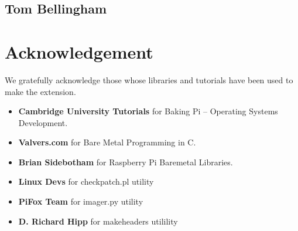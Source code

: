 \documentclass[11pt]{article}
\begin{document}
\subsection{Tom Bellingham}

\section{Acknowledgement}

We gratefully acknowledge those  whose libraries and tutorials have been used
to make the extension.

\begin{itemize}[noitemsep,topsep=0pt]
  \item \textbf{Cambridge University Tutorials} for Baking Pi –
    Operating Systems Development.
  \item \textbf{Valvers.com} for Bare Metal Programming in C.
  \item \textbf{Brian Sidebotham} for Raspberry Pi Baremetal Libraries.
  \item \textbf{Linux Devs} for checkpatch.pl utility
  \item \textbf{PiFox Team} for imager.py utility
  \item \textbf{D. Richard Hipp} for makeheaders utilility
\end{itemize}
\end{document}

